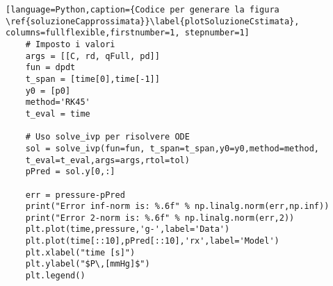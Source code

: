 \begin{lstlisting}[language=Python,caption={Codice per generare la figura \ref{soluzioneCapprossimata}}\label{plotSoluzioneCstimata}, columns=fullflexible,firstnumber=1, stepnumber=1]
    # Imposto i valori
    args = [[C, rd, qFull, pd]]
    fun = dpdt
    t_span = [time[0],time[-1]]
    y0 = [p0]
    method='RK45'
    t_eval = time

    # Uso solve_ivp per risolvere ODE
    sol = solve_ivp(fun=fun, t_span=t_span,y0=y0,method=method,
    t_eval=t_eval,args=args,rtol=tol)
    pPred = sol.y[0,:]

    err = pressure-pPred
    print("Error inf-norm is: %.6f" % np.linalg.norm(err,np.inf))
    print("Error 2-norm is: %.6f" % np.linalg.norm(err,2))
    plt.plot(time,pressure,'g-',label='Data')
    plt.plot(time[::10],pPred[::10],'rx',label='Model')
    plt.xlabel("time [s]")
    plt.ylabel("$P\,[mmHg]$")
    plt.legend()
\end{lstlisting}